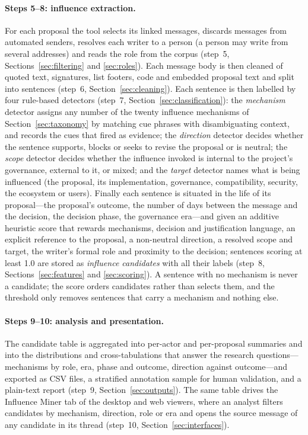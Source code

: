 \documentclass[sigconf,screen]{acmart}
\begin{document}
\paragraph{Steps 5--8: influence extraction.} For each proposal the tool selects its linked messages, discards messages from automated senders, resolves each writer to a person (a person may write from several addresses) and reads the role from the corpus (step~5, Sections~\ref{sec:filtering} and \ref{sec:roles}). Each message body is then cleaned of quoted text, signatures, list footers, code and embedded proposal text and split into sentences (step~6, Section~\ref{sec:cleaning}). Each sentence is then labelled by four rule-based detectors (step~7, Section~\ref{sec:classification}): the \emph{mechanism} detector assigns any number of the twenty influence mechanisms of Section~\ref{sec:taxonomy} by matching cue phrases with disambiguating context, and records the cues that fired as evidence; the \emph{direction} detector decides whether the sentence supports, blocks or seeks to revise the proposal or is neutral; the \emph{scope} detector decides whether the influence invoked is internal to the project's governance, external to it, or mixed; and the \emph{target} detector names what is being influenced (the proposal, its implementation, governance, compatibility, security, the ecosystem or users). Finally each sentence is situated in the life of its proposal---the proposal's outcome, the number of days between the message and the decision, the decision phase, the governance era---and given an additive heuristic score that rewards mechanisms, decision and justification language, an explicit reference to the proposal, a non-neutral direction, a resolved scope and target, the writer's formal role and proximity to the decision; sentences scoring at least 1.0 are stored as \emph{influence candidates} with all their labels (step~8, Sections~\ref{sec:features} and \ref{sec:scoring}). A sentence with no mechanism is never a candidate; the score orders candidates rather than selects them, and the threshold only removes sentences that carry a mechanism and nothing else.

\paragraph{Steps 9--10: analysis and presentation.} The candidate table is aggregated into per-actor and per-proposal summaries and into the distributions and cross-tabulations that answer the research questions---mechanisms by role, era, phase and outcome, direction against outcome---and exported as CSV files, a stratified annotation sample for human validation, and a plain-text report (step~9, Section~\ref{sec:outputs}). The same table drives the Influence Miner tab of the desktop and web viewers, where an analyst filters candidates by mechanism, direction, role or era and opens the source message of any candidate in its thread (step~10, Section~\ref{sec:interfaces}).
\end{document}
